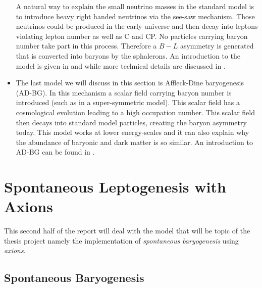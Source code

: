 \documentclass[13pt,a4paper,titlepage]{article}
\begin{document}
\begin{itemize}
    A natural way to explain the small neutrino masses in the standard model is to introduce heavy right handed neutrinos via the see-saw mechanism.
    Those neutrinos could be produced in the early universe and then decay into leptons violating lepton number as well as C and CP. No particles carrying baryon
    number take part in this process.
    Therefore a $B - L$ asymmetry is generated that is converted into baryons by the sphalerons. An introduction to the model is given in \cite{Leptogenesis_review_doi:10.1146/annurev.nucl.55.090704.151558} and \cite{Leptogenesis_Buchmüller:2014} while more technical details are discussed in \cite{Pedestrians_Buchm_ller_2005}.
    \item The last model we will discuss in this section is Affleck-Dine baryogenesis (AD-BG).
    In this mechanism a scalar field carrying baryon number is introduced (such as in a super-symmetric model).
    This scalar field has a cosmological evolution leading to a high occupation number. This scalar field then decays into standard model particles, creating the baryon asymmetry today.
    This model works at lower energy-scales and it can also explain why the abundance of baryonic and dark matter is so similar. An introduction to AD-BG can be found in \cite[Part III]{Dine_2003_Bayrogenesis}.
\end{itemize}


\section{Spontaneous Leptogenesis with Axions}
\label{sec:spontaneour_bayrogenesis}
This second half of the report will deal with the model that will be
topic of the thesis project namely the implementation of \emph{spontaneous baryogenesis} using \emph{axions}.

\subsection{Spontaneous Baryogenesis}
\label{sec:spontaneour_bayrogenesis_tradiaonal}
\end{document}
